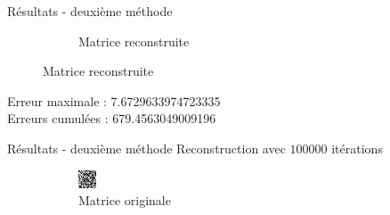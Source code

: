\documentclass{beamer}
\begin{document}
\begin{frame}{Résultats - deuxième méthode}
\begin{figure}[t]
\begin{subfigure}[b]{0.35\textwidth}
            \caption{Matrice reconstruite}
        \end{subfigure}
    \end{figure}
Erreur maximale : 7.6729633974723335\\
Erreurs cumulées : 679.4563049009196
\end{frame}

\begin{frame}{Résultats - deuxième méthode}
    Reconstruction avec $100 000$ itérations
    \begin{figure}[t]
        \centering
        \begin{subfigure}[b]{0.35\textwidth}
            \includegraphics[width=\textwidth]{matOriginale100.png}
            \caption{Matrice originale}
        \end{subfigure}
        \qquad \qquad 
        \pause
        \begin{subfigure}[b]{0.35\textwidth}

\end{subfigure}
\end{figure}
\end{frame}
\end{document}
